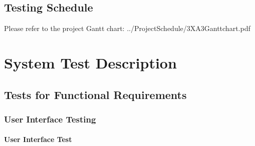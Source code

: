 \documentclass[12pt, titlepage]{article}
\begin{document}
\subsection{Testing Schedule}
Please refer to the project Gantt chart: ../ProjectSchedule/3XA3Ganttchart.pdf

\section{System Test Description}
	
\subsection{Tests for Functional Requirements}

\subsubsection{User Interface Testing}
		
\paragraph{User Interface Test}
\end{document}
